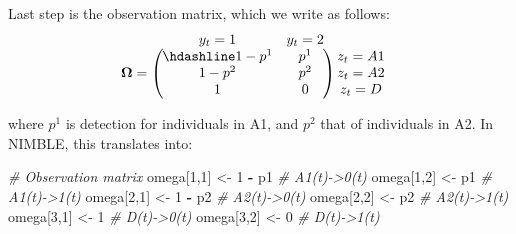 \documentclass[
  12pt,
]{krantz}
\newenvironment{Shaded}{\begin{snugshade}}{\end{snugshade}}
\newcommand{\CommentTok}[1]{\textcolor[rgb]{0.56,0.35,0.01}{\textit{#1}}}
\newcommand{\DecValTok}[1]{\textcolor[rgb]{0.00,0.00,0.81}{#1}}
\newcommand{\NormalTok}[1]{#1}
\newcommand{\OtherTok}[1]{\textcolor[rgb]{0.56,0.35,0.01}{#1}}
\newcommand{\SpecialCharTok}[1]{\textcolor[rgb]{0.81,0.36,0.00}{\textbf{#1}}}
\begin{document}
Last step is the observation matrix, which we write as follows:
\[\begin{matrix}
& \\
\mathbf{\Omega} =
  \left ( \vphantom{ \begin{matrix} 12 \\ 12 \\ 12\end{matrix} } \right .
          \end{matrix}
          \hspace{-1.2em}
          \begin{matrix}
          y_t=1 & y_t=2\\ \hdashline
          1 - p^1 & p^1\\
          1 - p^2 & p^2\\
          1 & 0
          \end{matrix}
          \hspace{-0.2em}
          \begin{matrix}
          & \\
          \left . \vphantom{ \begin{matrix} 12 \\ 12 \\ 12\end{matrix} } \right )
\begin{matrix}
z_{t}=A1 \\ z_{t}=A2 \\ z_{t}=D
\end{matrix}
\end{matrix}\]

where \(p^1\) is detection for individuals in A1, and \(p^2\) that of individuals in A2. In NIMBLE, this translates into:

\begin{Shaded}
\begin{Highlighting}[]
\CommentTok{\# Observation matrix}
\NormalTok{omega[}\DecValTok{1}\NormalTok{,}\DecValTok{1}\NormalTok{] }\OtherTok{\textless{}{-}} \DecValTok{1} \SpecialCharTok{{-}}\NormalTok{ p1   }\CommentTok{\# A1(t){-}\textgreater{}0(t)}
\NormalTok{omega[}\DecValTok{1}\NormalTok{,}\DecValTok{2}\NormalTok{] }\OtherTok{\textless{}{-}}\NormalTok{ p1       }\CommentTok{\# A1(t){-}\textgreater{}1(t)}
\NormalTok{omega[}\DecValTok{2}\NormalTok{,}\DecValTok{1}\NormalTok{] }\OtherTok{\textless{}{-}} \DecValTok{1} \SpecialCharTok{{-}}\NormalTok{ p2   }\CommentTok{\# A2(t){-}\textgreater{}0(t)}
\NormalTok{omega[}\DecValTok{2}\NormalTok{,}\DecValTok{2}\NormalTok{] }\OtherTok{\textless{}{-}}\NormalTok{ p2       }\CommentTok{\# A2(t){-}\textgreater{}1(t)}
\NormalTok{omega[}\DecValTok{3}\NormalTok{,}\DecValTok{1}\NormalTok{] }\OtherTok{\textless{}{-}} \DecValTok{1}         \CommentTok{\# D(t){-}\textgreater{}0(t)}
\NormalTok{omega[}\DecValTok{3}\NormalTok{,}\DecValTok{2}\NormalTok{] }\OtherTok{\textless{}{-}} \DecValTok{0}         \CommentTok{\# D(t){-}\textgreater{}1(t)}
\end{Highlighting}
\end{Shaded}
\end{document}
